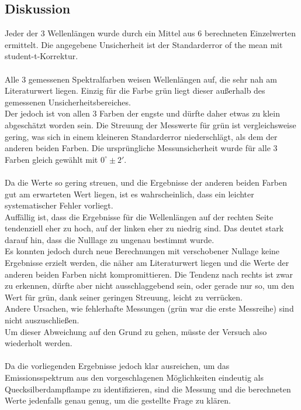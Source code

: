 \documentclass[12pt,a4paper]{article}
\begin{document}
\begin{multicols}{2}
\subsection{Diskussion}
Jeder der 3 Wellenlängen wurde durch ein Mittel aus 6 berechneten Einzelwerten ermittelt. 
Die angegebene Unsicherheit ist der Standarderror of the mean mit student-t-Korrektur.\\
\\
Alle 3 gemessenen Spektralfarben weisen Wellenlängen auf, die sehr nah am Literaturwert liegen. Einzig  für die Farbe grün liegt dieser außerhalb des gemessenen Unsicherheitsbereiches.\\
Der jedoch ist von allen 3 Farben der engste und dürfte daher etwas zu klein abgeschätzt worden sein. Die Streuung der Messwerte für grün ist vergleichsweise gering, was sich in einem kleineren Standarderror niederschlägt, als dem der anderen beiden Farben. Die ursprüngliche Messunsicherheit wurde für alle 3 Farben gleich gewählt mit $0^\circ \pm 2'$.\\
\\
Da die Werte so gering streuen, und die Ergebnisse der anderen beiden Farben gut am erwarteten Wert liegen, ist es wahrscheinlich, dass ein leichter systematischer Fehler vorliegt.\\
Auffällig ist, dass die Ergebnisse für die Wellenlängen  auf der rechten Seite tendenziell eher zu hoch, auf der linken eher zu niedrig sind. Das deutet stark darauf hin, dass die Nulllage zu ungenau bestimmt wurde.\\
Es konnten jedoch durch neue Berechnungen mit verschobener Nullage keine Ergebnisse erzielt werden, die näher am Literaturwert liegen und die Werte der anderen beiden Farben nicht kompromittieren. Die Tendenz nach rechts ist zwar zu erkennen, dürfte aber nicht ausschlaggebend sein, oder gerade nur so, um den Wert für grün, dank seiner geringen Streuung, leicht zu verrücken.\\
Andere Ursachen, wie fehlerhafte Messungen (grün war die erste Messreihe) sind nicht auszuschließen.\\
Um dieser Abweichung auf den Grund zu gehen, müsste der Versuch also wiederholt werden.\\
\\
Da die vorliegenden Ergebnisse jedoch klar ausreichen, um das Emissionsspektrum aus den vorgeschlagenen Möglichkeiten eindeutig als Quecksilberdampflampe zu identifizieren, sind die Messung und die berechneten Werte jedenfalls genau genug, um die gestellte Frage zu klären.


\end{multicols}
\end{document}
